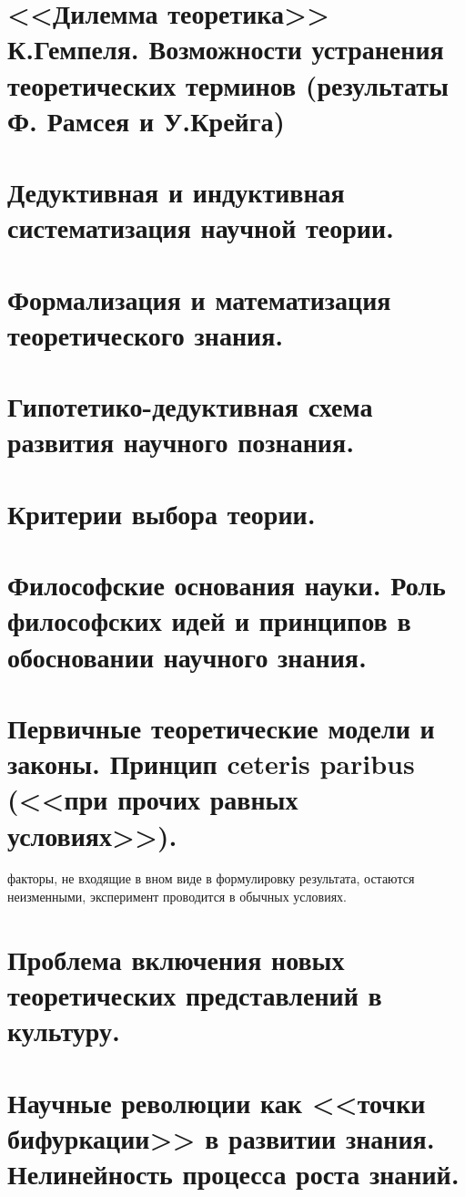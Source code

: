\documentclass[12pt, specialist, subf, substylefile = spbu.rtx]{disser}
\begin{document}
\section{<<Дилемма теоретика>> К.Гемпеля. Возможности устранения теоретических терминов (результаты Ф. Рамсея и У.Крейга)}

\section{Дедуктивная и индуктивная систематизация научной теории.}

\section{Формализация и математизация теоретического знания.}

\section{Гипотетико-дедуктивная схема развития научного познания.}

\section{Критерии выбора теории.}

\section{Философские основания науки. Роль философских идей и принципов в обосновании научного знания.}

\section{Первичные теоретические модели и законы. Принцип ceteris paribus (<<при прочих равных условиях>>).}
факторы, не входящие в вном виде в формулировку результата, остаются неизменными, эксперимент проводится в обычных условиях.

\section{Проблема включения новых теоретических представлений в культуру.}

\section{Научные революции как <<точки бифуркации>> в развитии знания. Нелинейность процесса роста знаний.}
\end{document}
